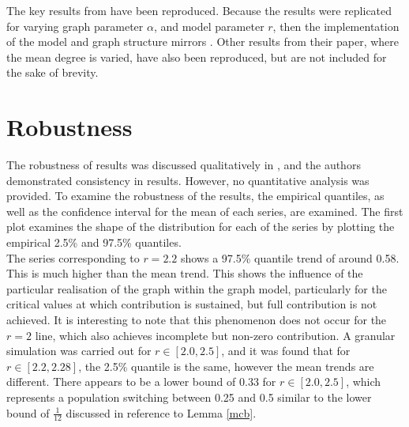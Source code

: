 The key results from \cite{RN49} have been reproduced. Because the results were replicated for varying graph parameter $\alpha$, and model parameter $r$, then the implementation of the model and graph structure mirrors \cite{RN49}. Other results from their paper, where the mean degree is varied, have also been reproduced, but are not included for the sake of brevity.


\section{Robustness}
The robustness of results was discussed qualitatively in \cite{RN49}, and the authors demonstrated consistency in results. However, no quantitative analysis was provided. To examine the robustness of the results, the empirical quantiles, as well as the confidence interval for the mean of each series, are examined. The first plot examines the shape of the distribution for each of the series by plotting the empirical 2.5\% and 97.5\% quantiles. \\

\FloatBarrier
{}
\FloatBarrier
The series corresponding to $r=2.2$ shows a 97.5\% quantile trend of around 0.58. This is much higher than the mean trend. This shows the influence of the particular realisation of the graph within the graph model, particularly for the critical values at which contribution is sustained, but full contribution is not achieved. It is interesting to note that this phenomenon does not occur for the $r=2$ line, which also achieves incomplete but non-zero contribution. A granular simulation was carried out for $r \in [2.0,2.5]$, and it was found that for $r \in [2.2, 2.28]$, the 2.5\% quantile is the same, however the mean trends are different. There appears to be a lower bound of 0.33 for $r \in [2.0, 2.5]$, which represents a population switching between 0.25 and 0.5 similar to the lower bound of $\tfrac{1}{12}$ discussed in reference to Lemma \ref{mcb}.\\

